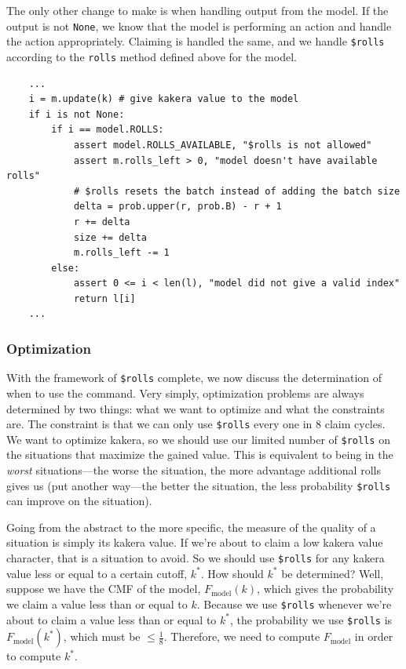 \documentclass[11pt, oneside]{article}
\theoremstyle{plain}
\theoremstyle{definition}
\begin{document}
The only other change to make is when handling output from the model. If the
output is not \texttt{None}, we know that the model is performing
an action and handle the action appropriately. Claiming is handled the same,
and we handle \texttt{\$rolls} according to the \texttt{rolls} method defined
above for the model.
\begin{verbatim}
    ...
    i = m.update(k) # give kakera value to the model 
    if i is not None:
        if i == model.ROLLS:
            assert model.ROLLS_AVAILABLE, "$rolls is not allowed"
            assert m.rolls_left > 0, "model doesn't have available rolls"
            # $rolls resets the batch instead of adding the batch size
            delta = prob.upper(r, prob.B) - r + 1
            r += delta
            size += delta
            m.rolls_left -= 1
        else:
            assert 0 <= i < len(l), "model did not give a valid index"
            return l[i]
    ...
\end{verbatim}

\subsubsection{Optimization}
With the framework of \texttt{\$rolls} complete, we now discuss the
determination of when to use the command. Very simply, optimization
problems are always determined by two things: what we want to optimize
and what the constraints are. The constraint is that we can only use
\texttt{\$rolls} every one in 8 claim cycles. We want to optimize kakera,
so we should use our limited number of \texttt{\$rolls} on the situations
that maximize the gained value. This is equivalent to being in the
\textit{worst} situations---the worse the situation, the more advantage
additional rolls gives us (put another way---the better the situation,
the less probability \texttt{\$rolls} can improve on the situation).

Going from the abstract to the more specific, the measure of the quality
of a situation is simply its kakera value. If we're about to claim a low
kakera value character, that is a situation to avoid. So we should use
\texttt{\$rolls} for any kakera value less or equal to a certain cutoff,
\( k^* \). How should \( k^* \) be determined? Well, suppose we have the
CMF of the model, \( F_\text{model}(k) \), which gives the probability we
claim a value less than or equal to \( k \). Because we use \texttt{\$rolls}
whenever we're about to claim a value less than or equal to \( k^* \), the
probability we use \texttt{\$rolls} is \( F_\text{model}(k^*) \), which must
be \( \leq \frac{1}{8} \). Therefore, we need to compute \( F_\text{model}
\) in order to compute \( k^* \).
\end{document}
